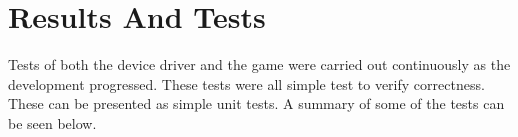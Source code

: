 \section{Results And Tests}
Tests of both the device driver and the game were carried out continuously as the development progressed. These tests were all simple test to verify correctness. These can be presented as simple unit tests. A summary of some of the tests can be seen below.  






